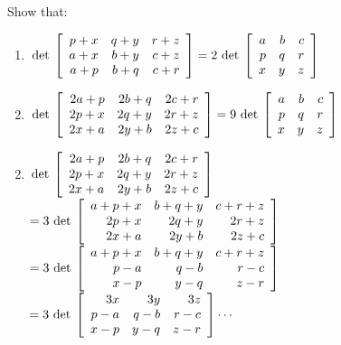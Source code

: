 \begin{multicols}{2}
\begin{ex}
\begin{sol}
\begin{enumerate}[label={\alph*.}]
\end{enumerate}
\end{sol}
\end{ex}

\begin{ex}
Show that:


\begin{enumerate}[leftmargin=1em,label={\alph*.}]
\item $\thinspace\operatorname{det\medspace} \left[ \begin{array}{rrr}
p+x & q+y & r+z  \\
a+x & b+y & c+z  \\
a+p & b+q & c+r 
\end{array} \right] = 2\thinspace\operatorname{det\medspace} \left[ \begin{array}{rrr}
a & b & c  \\
p & q & r  \\
x & y & z 
\end{array} \right]$


\item  $\thinspace\operatorname{det\medspace} \left[ \begin{array}{rrr}
2a+p & 2b+q & 2c+r  \\
2p+x & 2q+y & 2r+z  \\
2x+a & 2y+b & 2z+c 
\end{array} \right] = 9\thinspace\operatorname{det\medspace} \left[ \begin{array}{rrr}
a & b & c  \\
p & q & r  \\
x & y & z 
\end{array} \right]$



\end{enumerate}
\begin{sol}
\begin{enumerate}[label={\alph*.}]
\setcounter{enumi}{1}
\item $\thinspace\operatorname{det\medspace} \left[ \begin{array}{rrr}
2a+p & 2b+q & 2c+r  \\
2p+x & 2q+y & 2r+z  \\
2x+a & 2y+b & 2z+c 
\end{array} \right]$ \\ 
$= 3 \thinspace\operatorname{det\medspace} \left[ \begin{array}{rrr}
a+p+x & b+q+y & c+r+z  \\
2p+x & 2q+y & 2r+z  \\
2x+a & 2y+b & 2z+c 
\end{array} \right]$ \\
$= 3 \thinspace\operatorname{det\medspace} \left[ \begin{array}{rrr}
a+p+x & b+q+y & c+r+z  \\
p-a & q-b & r-c  \\
x-p & y-q & z-r 
\end{array} \right]$ \\
$= 3 \thinspace\operatorname{det\medspace} \left[ \begin{array}{rrr}
3x & 3y & 3z  \\
p-a & q-b & r-c  \\
x-p & y-q & z-r 
\end{array} \right] \cdots$


\end{enumerate}
\end{sol}
\end{ex}
\end{multicols}
